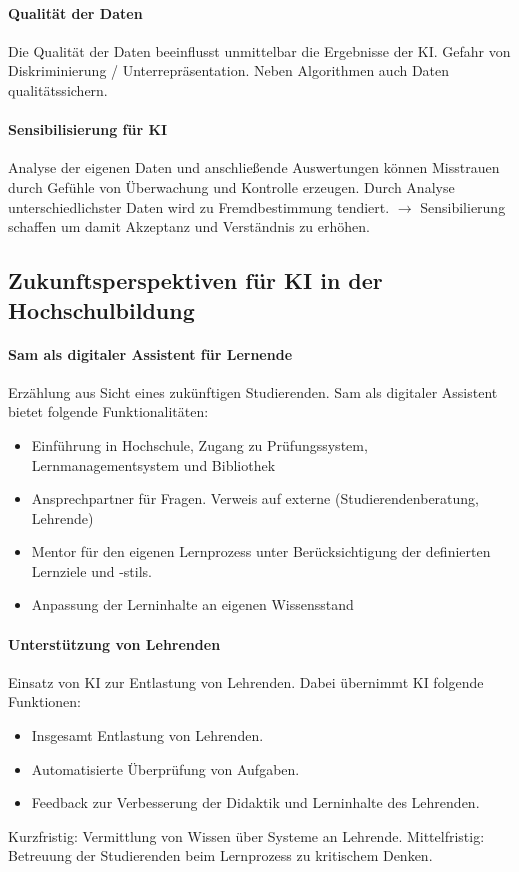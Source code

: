\paragraph*{Qualität der Daten} Die Qualität der Daten beeinflusst unmittelbar die Ergebnisse der KI. Gefahr von Diskriminierung / Unterrepräsentation. Neben Algorithmen auch Daten qualitätssichern.

\paragraph*{Sensibilisierung für KI} Analyse der eigenen Daten und anschließende Auswertungen können Misstrauen durch Gefühle von Überwachung und Kontrolle erzeugen. Durch Analyse unterschiedlichster Daten wird zu Fremdbestimmung tendiert. $\rightarrow$ Sensibilierung schaffen um damit Akzeptanz und Verständnis zu erhöhen.

\subsection{Zukunftsperspektiven für KI in der Hochschulbildung}

\paragraph*{Sam als digitaler Assistent für Lernende}
Erzählung aus Sicht eines zukünftigen Studierenden. Sam als digitaler Assistent bietet folgende Funktionalitäten:
\begin{itemize}
    \item Einführung in Hochschule, Zugang zu Prüfungssystem, Lernmanagementsystem und Bibliothek
    \item Ansprechpartner für Fragen. Verweis auf externe (Studierendenberatung, Lehrende)
    \item Mentor für den eigenen Lernprozess unter Berücksichtigung der definierten Lernziele und -stils.
    \item Anpassung der Lerninhalte an eigenen Wissensstand
\end{itemize}

\paragraph*{Unterstützung von Lehrenden} Einsatz von KI zur Entlastung von Lehrenden. Dabei übernimmt KI folgende Funktionen:
\begin{itemize}
    \item Insgesamt Entlastung von Lehrenden.
    \item Automatisierte Überprüfung von Aufgaben.
    \item Feedback zur Verbesserung der Didaktik und Lerninhalte des Lehrenden.
\end{itemize}
Kurzfristig: Vermittlung von Wissen über Systeme an Lehrende. Mittelfristig: Betreuung der Studierenden beim Lernprozess zu kritischem Denken.